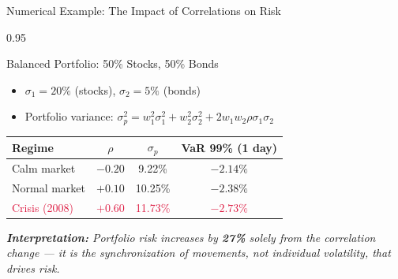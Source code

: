 \documentclass[9pt, aspectratio=169, t]{beamer}
\begin{document}
\begin{frame}{Numerical Example: The Impact of Correlations on Risk}
    \begin{cminipage}{0.95\textwidth}
    {\footnotesize
    \begin{exampleblock}{Balanced Portfolio: 50\% Stocks, 50\% Bonds}
        \begin{itemize}\setlength{\itemsep}{0pt}
            \item $\sigma_1 = 20\%$ (stocks), $\sigma_2 = 5\%$ (bonds)
            \item Portfolio variance: $\sigma_p^2 = w_1^2\sigma_1^2 + w_2^2\sigma_2^2 + 2w_1w_2\rho\sigma_1\sigma_2$
        \end{itemize}
        \vspace{0.1cm}
        \begin{center}
        \begin{tabular}{lccc}
            \hline
            \textbf{Regime} & \textbf{$\rho$} & \textbf{$\sigma_p$} & \textbf{VaR 99\% (1 day)} \\
            \hline
            Calm market & $-0.20$ & 9.22\% & $-2.14\%$ \\
            Normal market & $+0.10$ & 10.25\% & $-2.38\%$ \\
            \textcolor{Crimson}{Crisis (2008)} & \textcolor{Crimson}{$+0.60$} & \textcolor{Crimson}{11.73\%} & \textcolor{Crimson}{$-2.73\%$} \\
            \hline
        \end{tabular}
        \end{center}
    \end{exampleblock}
    \vspace{0.1cm}
    \textit{\textbf{Interpretation:} Portfolio risk increases by \textbf{27\%} solely from the correlation change --- it is the synchronization of movements, not individual volatility, that drives risk.}
    }
    \end{cminipage}
\end{frame}
\end{document}
